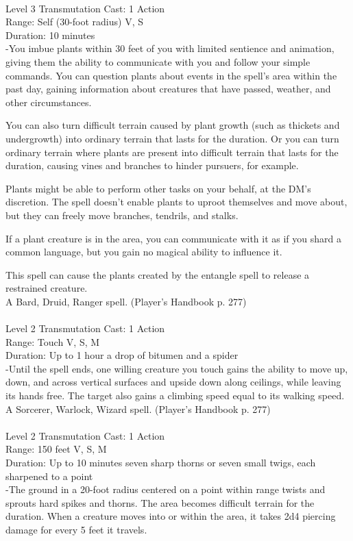 \documentclass[10pt,twocolumn]{report}
\begin{document}
 \\
Level 3 \quad Transmutation \quad Cast: 1 Action\\
Range: Self (30-foot radius) \quad V, S\\
Duration: 10 minutes \quad \\
-You imbue plants within 30 feet of you with limited sentience and animation, giving them the ability to communicate with you and follow your simple commands. You can question plants about events in the spell’s area within the past day, gaining information about creatures that have passed, weather, and other circumstances.

You can also turn difficult terrain caused by plant growth (such as thickets and undergrowth) into ordinary terrain that lasts for the duration. Or you can turn ordinary terrain where plants are present into difficult terrain that lasts for the duration, causing vines and branches to hinder pursuers, for example.

Plants might be able to perform other tasks on your behalf, at the DM’s discretion. The spell doesn’t enable plants to uproot themselves and move about, but they can freely move branches, tendrils, and stalks.

If a plant creature is in the area, you can communicate with it as if you shard a common language, but you gain no magical ability to influence it.

This spell can cause the plants created by the entangle spell to release a restrained creature.\\
A Bard, Druid, Ranger spell. (Player's Handbook p. 277) \\


 \\
Level 2 \quad Transmutation \quad Cast: 1 Action\\
Range: Touch \quad V, S, M\\
Duration: Up to 1 hour \quad a drop of bitumen and a spider\\
-Until the spell ends, one willing creature you touch gains the ability to move up, down, and across vertical surfaces and upside down along ceilings, while leaving its hands free. The target also gains a climbing speed equal to its walking speed.\\
A Sorcerer, Warlock, Wizard spell. (Player's Handbook p. 277) \\


 \\
Level 2 \quad Transmutation \quad Cast: 1 Action\\
Range: 150 feet \quad V, S, M\\
Duration: Up to 10 minutes \quad seven sharp thorns or seven small twigs, each sharpened to a point\\
-The ground in a 20-foot radius centered on a point within range twists and sprouts hard spikes and thorns. The area becomes difficult terrain for the duration. When a creature moves into or within the area, it takes 2d4 piercing damage for every 5 feet it travels.
\end{document}
